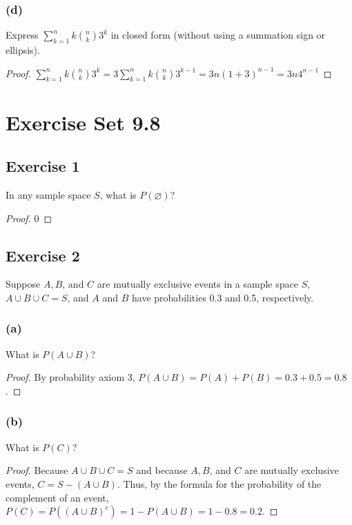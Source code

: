 \documentclass[14pt]{extarticle}
\newcommand{\dps}{\displaystyle}
\newcommand{\es}{\varnothing}
\begin{document}
\subsubsection{(d)}
Express \(\dps \sum_{k=1}^{n} k \binom{n}{k} 3^k\) in closed form (without using a summation sign or ellipsis).

\begin{proof}
     \(\dps \sum_{k=1}^{n} k \binom{n}{k} 3^k = 3 \sum_{k=1}^{n} k \binom{n}{k} 3^{k-1} = 3n(1+3)^{n-1} = 3n4^{n-1}\)
\end{proof}

\section{Exercise Set 9.8}
\subsection{Exercise 1}
In any sample space \(S\), what is \(P(\es)\)?
\begin{proof}
     0
\end{proof}

\subsection{Exercise 2}
Suppose \(A, B\), and \(C\) are mutually exclusive events in a sample space \(S\), \(A \cup B \cup C = S\), and \(A\) and
\(B\) have probabilities 0.3 and 0.5, respectively.

\subsubsection{(a)}
What is \(P(A \cup B)\)?
\begin{proof}
     By probability axiom 3, \(P(A \cup B) = P(A) + P(B) = 0.3 + 0.5 = 0.8\).
\end{proof}

\subsubsection{(b)}
What is \(P(C)\)?
\begin{proof}
     Because \(A \cup B \cup C = S\) and because \(A, B\), and \(C\) are mutually exclusive events, \(C = S - (A \cup B)\).
     Thus, by the formula for the probability of the complement of an event, \(P(C) = P((A \cup B)^c) = 1 - P(A \cup B) = 1 - 0.8
     = 0.2\).
\end{proof}
\end{document}

